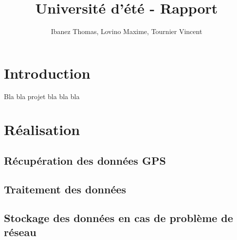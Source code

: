 \documentclass[a4paper,11pt]{article}
\title{Université d'été - Rapport}
\author{Ibanez Thomas, Lovino Maxime, Tournier Vincent}
\begin{document}
\maketitle
\section{Introduction}
Bla bla projet bla bla bla
\section{Réalisation}
\subsection{Récupération des données GPS}

\subsection{Traitement des données}

\subsection{Stockage des données en cas de problème de réseau}
\end{document}
